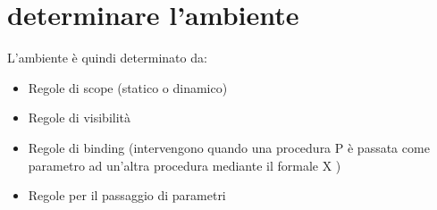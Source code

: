 \section{determinare l'ambiente}

L'ambiente è quindi determinato da:

\begin{itemize}
    \item Regole di scope (statico o dinamico)
    \item Regole di visibilità
    \item Regole di binding (intervengono quando una procedura P è passata come parametro ad un’altra procedura mediante il formale X )
    \item Regole per il passaggio di parametri
\end{itemize}

% 
